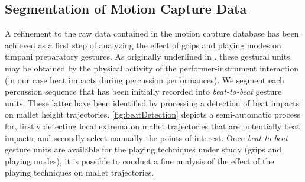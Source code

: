 		\subsection{Segmentation of Motion Capture Data}
		\label{subsec:Analysis_TimpaniAnalysis_Segmentation}

A refinement to the raw data contained in the motion capture database has been achieved as a first step of analyzing the effect of grips and playing modes on timpani preparatory gestures. As originally underlined in , these gestural units may be obtained by the physical activity of the performer-instrument interaction (in our case beat impacts during percussion performances). We segment each percussion sequence that has been initially recorded into \emph{beat-to-beat} gesture units. These latter have been identified by processing a detection of beat impacts on mallet height trajectories. \myfigname \ref{fig:beatDetection} depicts a semi-automatic process for, firstly detecting local extrema on mallet trajectories that are potentially beat impacts, and secondly select manually the points of interest. Once \emph{beat-to-beat} gesture units are available for the playing techniques under study (grips and playing modes), it is possible to conduct a fine analysis of the effect of the playing techniques on mallet trajectories.

